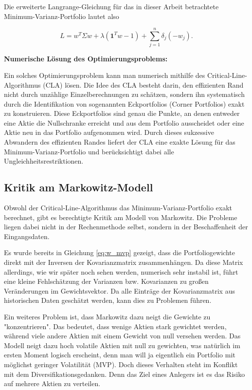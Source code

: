 \documentclass[parskip=half]{scrartcl}
\begin{document}
	Die erweiterte Langrange-Gleichung für das in dieser Arbeit betrachtete Minimum-Varianz-Portfolio lautet also
	
	\begin{equation}
		L = w^T \Sigma w + \lambda (\mathbf{1}^Tw - 1) + \sum_{j=1}^{n} \delta_j  (-w_j) . \label{eq:kkt_mvp}
	\end{equation}
	
	\textbf{Numerische Lösung des Optimierungsproblems: }
	
	Ein solches Optimierungsproblem kann man numerisch mithilfe des Critical-Line-Algorithmus (CLA) lösen. Die Idee des CLA besteht darin, den effizienten Rand nicht durch unzählige Einzelberechnungen zu schätzen, sondern ihn systematisch durch die Identifikation von sogenannten Eckportfolios (Corner Portfolios) exakt zu konstruieren. Diese Eckportfolios sind genau die Punkte, an denen entweder eine Aktie die Nullschranke erreicht und aus dem Portfolio ausscheidet oder eine Aktie neu in das Portfolio aufgenommen wird. Durch dieses sukzessive Abwandern des effizienten Randes liefert der CLA eine exakte Lösung für das Minimum-Varianz-Portfolio und berücksichtigt dabei alle Ungleichheitsrestriktionen.
	
	\subsection{Kritik am Markowitz-Modell}
	
	Obwohl der Critical-Line-Algorithmus das Minimum-Varianz-Portfolio exakt berechnet, gibt es berechtigte Kritik am Modell von Markowitz. Die Probleme liegen dabei nicht in der Rechenmethode selbst, sondern in der Beschaffenheit der Eingangsdaten. 
	
	Es wurde bereits in Gleichung \eqref{eq:w_mvp} gezeigt, dass die Portfoliogewichte direkt mit der Inversen der Kovarianzmatrix zusammenhängen. Da diese Matrix allerdings, wie wir später noch sehen werden, numerisch sehr instabil ist, führt eine kleine Fehlschätzung der Varianzen bzw. Kovarianzen zu großen Veränderungen im Gewichtsvektor. Da alle Einträge der Kovarianzmatrix aus historischen Daten geschätzt werden, kann dies zu Problemen führen.
	
	Ein weiteres Problem ist, dass Markowitz dazu neigt die Gewichte zu "konzentrieren". Das bedeutet, dass wenige Aktien stark gewichtet werden, während viele andere Aktien mit einem Gewicht von null versehen werden. Das Modell neigt dazu hoch volatile Aktien mit null zu gewichten, was natürlich im ersten Moment logisch erscheint, denn man will ja eigentlich ein Portfolio mit möglichst geringer Volatilität (MVP). Doch dieses Verhalten steht im Konflikt mit dem Diversifikationsgedanken. Denn das Ziel eines Anlegers ist es das Risiko auf mehrere Aktien zu verteilen. 
	
\end{document}
